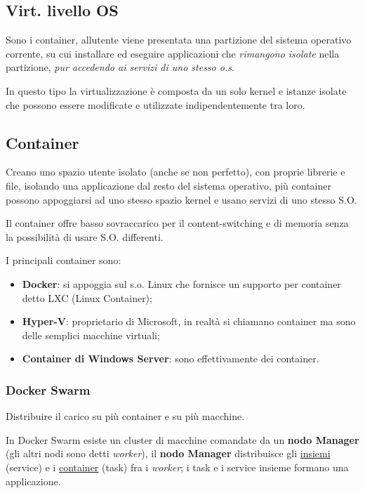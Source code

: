 \subsection{Virt. livello OS}\label{virt.-livello-os}

Sono i container, all\textquotesingle utente viene presentata una
partizione del sistema operativo corrente, su cui installare ed eseguire
applicazioni che \emph{rimangono isolate} nella partizione, \emph{pur
accedendo ai servizi di uno stesso o.s}.

In questo tipo la virtualizzazione è composta da un solo kernel e
istanze isolate che possono essere modificate e utilizzate
indipendentemente tra loro.

\subsection{Container}\label{container}

Creano uno spazio utente isolato (anche se non perfetto), con proprie
librerie e file, isolando una applicazione dal resto del sistema
operativo, più container possono appoggiarsi ad uno stesso spazio kernel
e usano servizi di uno stesso S.O.

Il container offre basso sovraccarico per il content-switching e di
memoria senza la possibilità di usare S.O. differenti.

I principali container sono:

\begin{itemize}
\item
  \textbf{Docker}: si appoggia sul s.o. Linux che fornisce un supporto
  per container detto LXC (Linux Container);
\item
  \textbf{Hyper-V}: proprietario di Microsoft, in realtà si chiamano
  container ma sono delle semplici macchine virtuali;
\item
  \textbf{Container di Windows Server}: sono effettivamente dei
  container.
\end{itemize}

\subsubsection{Docker Swarm}\label{docker-swarm}

Distribuire il carico su più container e su più macchine.

In Docker Swarm esiste un cluster di macchine comandate da un
\textbf{nodo Manager} (gli altri nodi sono detti \emph{worker}), il
\textbf{nodo Manager} distribuisce gli \ul{insiemi} (service) e i
\ul{container} (task) fra i \emph{worker}; i task e i service insieme
formano una applicazione.


